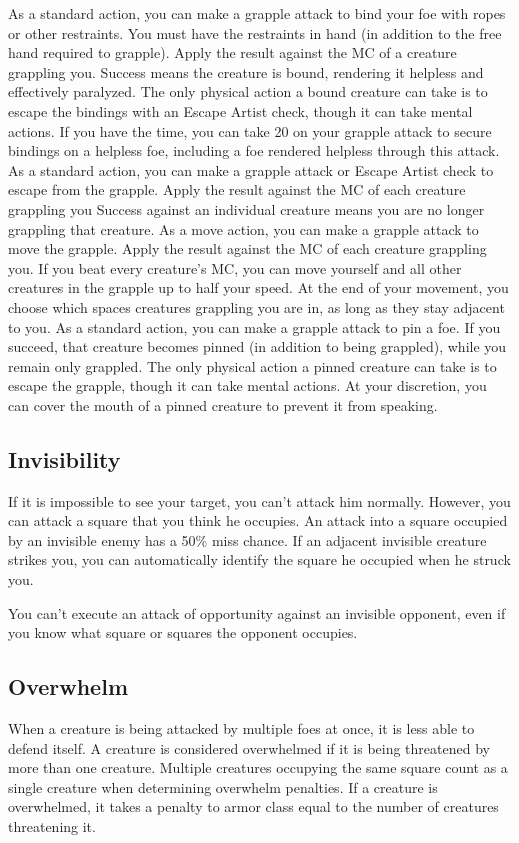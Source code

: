  As a standard action, you can make a grapple attack to bind your foe with ropes or other restraints. You must have the restraints in hand (in addition to the free hand required to grapple). Apply the result against the MC of a creature grappling you. Success means the creature is bound, rendering it helpless and effectively paralyzed. The only physical action a bound creature can take is to escape the bindings with an Escape Artist check, though it can take mental actions. If you have the time, you can take 20 on your grapple attack to secure bindings on a helpless foe, including a foe rendered helpless through this attack.
 As a standard action, you can make a grapple attack or Escape Artist check to escape from the grapple. Apply the result against the MC of each creature grappling you Success against an individual creature means you are no longer grappling that creature.
 As a move action, you can make a grapple attack to move the grapple. Apply the result against the MC of each creature grappling you. If you beat every creature's MC, you can move yourself and all other creatures in the grapple up to half your speed. At the end of your movement, you choose which spaces creatures grappling you are in, as long as they stay adjacent to you.
 As a standard action, you can make a grapple attack to pin a foe. If you succeed, that creature becomes pinned (in addition to being grappled), while you remain only grappled. The only physical action a pinned creature can take is to escape the grapple, though it can take mental actions. At your discretion, you can cover the mouth of a pinned creature to prevent it from speaking. 

\subsection{Invisibility}
If it is impossible to see your target, you can't attack him normally. However, you can attack a square that you think he occupies. An attack into a square occupied by an invisible enemy has a 50\% miss chance. If an adjacent invisible creature strikes you, you can automatically identify the square he occupied when he struck you.

You can't execute an attack of opportunity against an invisible opponent, even if you know what square or squares the opponent occupies.

\subsection{Overwhelm}\label{Overwhelm}
When a creature is being attacked by multiple foes at once, it is less able to defend itself. A creature is considered overwhelmed if it is being threatened by more than one creature. Multiple creatures occupying the same square count as a single creature when determining overwhelm penalties. If a creature is overwhelmed, it takes a penalty to armor class equal to the number of creatures threatening it.

